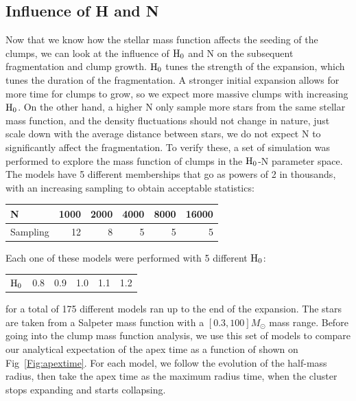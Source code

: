 \subsection{Influence of H and N}

Now that we know how the stellar mass function affects the seeding of the clumps, we can look at the influence of ${\textrm{H}}_0$ and N on the subsequent fragmentation and clump growth. ${\textrm{H}}_0$ tunes the strength of the expansion, which tunes the duration of the fragmentation. A stronger initial expansion allows for more time for clumps to grow, so we expect more massive clumps with increasing ${\textrm{H}}_0$. On the other hand, a higher N only sample more stars from the same stellar mass function, and the density fluctuations should not change in nature, just scale down with the average distance between stars, we do not expect N to significantly affect the fragmentation. To verify these, a set of simulation was performed to explore the mass function of clumps in the ${\textrm{H}}_0$-N parameter space. The models have 5 different memberships that go as powers of 2 in thousands, with an increasing sampling to obtain acceptable statistics:
\begin{center}
\begin{tabular}{l|rrrrr}
\centering
N   & 1000 & 2000 & 4000 & 8000 & 16000\\ 
\hline
Sampling & 12 & 8 & 5 & 5 & 5\\
\end{tabular}
\end{center}
Each one of these models were performed with 5 different ${\textrm{H}}_0$:
\begin{center}
\begin{tabular}{l|rrrrr}
${\textrm{H}}_0$ & 0.8 & 0.9 & 1.0 & 1.1 & 1.2
\end{tabular}
\end{center}
for a total of 175 different models ran up to the end of the expansion. The stars are taken from a Salpeter mass function with a $[0.3, 100] M_\odot$ mass range. Before going into the clump mass function analysis, we use this set of models to compare our analytical expectation of the apex time as a function of \tHub shown on Fig~\ref{Fig:apextime}. For each model, we follow the evolution of the half-mass radius, then take the apex time as the maximum radius time, when the cluster stops expanding and starts collapsing. 


